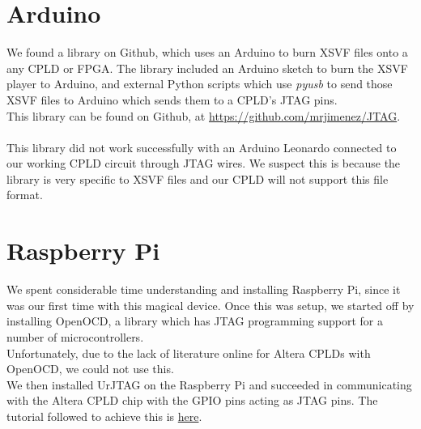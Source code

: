 \documentclass[11pt]{article}
\begin{document}
\section*{Arduino}
We found a library on Github, which uses an Arduino to burn XSVF files onto a any CPLD or FPGA. The library included an Arduino sketch to burn the XSVF player to Arduino, and external Python scripts which use \textsl{pyusb} to send those XSVF files to Arduino which sends them to a CPLD's JTAG pins.\\
This library can be found on Github, at \href{https://github.com/mrjimenez/JTAG}{https://github.com/mrjimenez/JTAG}.\\\\
This library did not work successfully with an Arduino Leonardo connected to our working CPLD circuit through JTAG wires. We suspect this is because the library is very specific to XSVF files and our CPLD will not support this file format.
\section*{Raspberry Pi}
We spent considerable time understanding and installing Raspberry Pi, since it was our first time with this magical device. Once this was setup, we started off by installing OpenOCD, a library which has JTAG programming support for a number of microcontrollers.\\
Unfortunately, due to the lack of literature online for Altera CPLDs with OpenOCD, we could not use this.\\We then installed UrJTAG on the Raspberry Pi and succeeded in communicating with the Altera CPLD chip with the GPIO pins acting as JTAG pins. The tutorial followed to achieve this is \href{https://saturn.ffzg.hr/rot13/index.cgi?action=display_html;page_name=urjtag}{here}.\\
\end{document}
